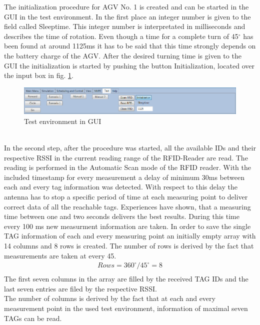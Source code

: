The initialization procedure for AGV No. 1 is created and can be started in the GUI in the test environment. In the first place an integer number is given to the field called Sleeptime. This integer number is interpretated in milliseconds and describes the time of rotation. Even though a time for a complete turn of 45$^\circ$  has been found at around 1125ms it has to be said that this time strongly depends on the battery charge of the AGV. After the desired turning time is given to the GUI the initialization is started by pushing the button Initialization, located over the input box in fig.  \ref{Screenshot_Test_environment}.\\
\begin{figure}[!htbp]
\centering
\includegraphics[width = 16cm]{Pictures/Screenshot_Test_environment}
\caption{Test environment in GUI}
\label{Screenshot_Test_environment}
\end{figure}\\
In the second step, after the procedure was started, all the available IDs and their respective RSSI in the current reading range of the RFID-Reader are read. The reading is performed in the Automatic Scan mode of the RFID reader\cite{KTSSysteme.2017}. With the included timestamp for every measurement a delay of minimum 30ms between each and every tag information was detected. With respect to this delay the antenna has to stop a specific period of time at each measuring point to deliver correct data of all the reachable tags. Experiences have shown, that a measuring time between one and two seconds delivers the best results. During this time every 100 ms new measurment information are taken. In order to save the single TAG information of each and every measuring point an initially empty array with 14 columns and 8 rows is created. 
The number of rows is derived by the fact that measurements are taken at every 45\textdegree. \\
\begin{align}
Rows = 360^\circ/45^\circ = 8\\
\end{align}
The first seven columns in the array are filled by the received TAG IDs and the last seven entries are filed by the respective RSSI. \\
The number of columns is derived by the fact that at each and every measurement point in the used test environment, information of maximal seven TAGs can be read. \\
